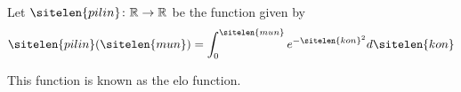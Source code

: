 \documentclass{article}
\begin{document}
	Let $\sitelen{pilin} \colon \mathbb R \to \mathbb R$ be the function given by
	\[ \sitelen{pilin}(\sitelen{mun}) = \int_0^{\sitelen{mun}} e^{-\sitelen{kon}^2} d \sitelen{kon} \]

	This function is known as the {\sitelenpona elo} function.
\end{document}
